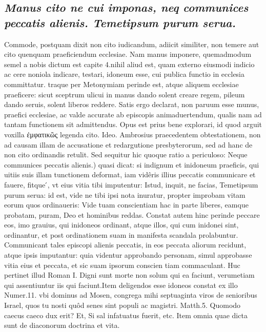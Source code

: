 \documentclass{article}
\begin{document}
\begin{pages}
\subsection*{\textit{Manus cito ne cui imponas, neq communices peccatis alienis. Temetipsum purum serua. }}\pstart Commode, postquam dixit non cito iudicandum, adiicit similiter, non temere aut cito quenquam praeficiendum ecclesiae. Nam manus imponere, quemadmodum semel a nobis dictum est capite 4.nihil aliud est, quam externo eiusmodi indicio ac cere noniola indicare, testari, idoneum esse, cui publica functio in ecclesia committatur. traque per Metonymiam perinde est, atque aliquem ecclesiae praeficere: sicut sceptrum ulicui in manus dando solent creare regem, pileum dando seruis, solent liberos reddere. Satis ergo declarat, non paruum esse munus, praefici ecclesiae, ac valde accurate ab episcopis animaduertendum, qualis nam ad tantam functionem sit admittendus. Opus est prius bene explorari, id quod arguit voxilla ἐμφατικῶς legenda cito. Ideo. Ambrosius praecedentem obtestationem, non ad causam illam de accusatione et redargutione presbyterorum, sed ad hanc de non cito ordinandis retulit. Sed sequitur hic quoque ratio a periculoso:  \pend\pstart Neque communices peccatis alienis.) quasi dicat: si indignum et inidoneum praeficis, qui uitiis suis illam tunctionem deformat, iam vidêris illius peccatis communicare et fauere, fitque ́, vt eius vitia tibi imputentur: Istud, inquit, ne facias, Temetipsum purum serua: id est, vide ne tibi ipsi nota inuratur, propter improbam vitam eorum quos ordinaueris: Vide tuam conscientiam hac in parte liberes, eamque probatam, puram, Deo et hominibus reddas. Constat autem hinc perinde peccare eos, imo grauius, qui inidoneos ordinant, atque illos, qui cum inidonei sint, ordinantur, et post ordinationem suam in manifesta scandala prolabuntur. Communicant tales episcopi alienis peccatis, in eos peccata aliorum recidunt, atque ipsis imputantur: quia videntur approbando personam, simul approbasse vitia eius et peccata, et sic suam ipsorum conscien tiam commaculant. Huc pertinet illud Roman I. Digni sunt morte non solum qui ea faciunt, verumetiam qui assentiuntur iis qui faciunt.Item deligendos esse idoneos constat ex illo Numer.11. vbi dominus ad Mosen, congrega mihi septuaginta viros de senioribus Israel, quos tu nosti quôd senes sint populi ac magistri. Matth.5. Quomodo caecus caeco dux erit? Et, Si sal infatuatus fuerit, etc. Item omnia quae dicta sunt de diaconorum doctrina et vita.  \pend
{}
{}

\end{pages}
\end{document}
